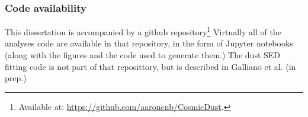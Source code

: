   \subsubsection{Code availability}
    This dissertation is accompanied by a github repository\footnote{Available at: \url{https://github.com/aaroncnb/CosmicDust}.} Virtually all of the analyses code are available in that repository, in the form of Jupyter notebooks (along with the figures and the code used to generate them.) The dust SED fitting code is not part of that reposittory, but is described in Galliano et al. (in prep.)
